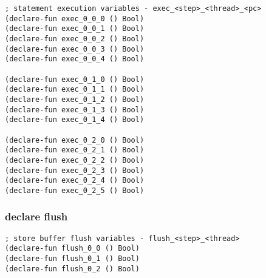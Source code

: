 \begin{algorithm}[H]
\end{algorithm}

\begin{algorithm}[H]
\end{algorithm}

\begin{lstlisting}[language=SMTLib]
; statement execution variables - exec_<step>_<thread>_<pc>
(declare-fun exec_0_0_0 () Bool)
(declare-fun exec_0_0_1 () Bool)
(declare-fun exec_0_0_2 () Bool)
(declare-fun exec_0_0_3 () Bool)
(declare-fun exec_0_0_4 () Bool)

(declare-fun exec_0_1_0 () Bool)
(declare-fun exec_0_1_1 () Bool)
(declare-fun exec_0_1_2 () Bool)
(declare-fun exec_0_1_3 () Bool)
(declare-fun exec_0_1_4 () Bool)

(declare-fun exec_0_2_0 () Bool)
(declare-fun exec_0_2_1 () Bool)
(declare-fun exec_0_2_2 () Bool)
(declare-fun exec_0_2_3 () Bool)
(declare-fun exec_0_2_4 () Bool)
(declare-fun exec_0_2_5 () Bool)
\end{lstlisting}

\subsubsection{declare flush}

\begin{algorithm}[H]
\end{algorithm}

\begin{algorithm}[H]
\end{algorithm}

\begin{lstlisting}[language=SMTLib]
; store buffer flush variables - flush_<step>_<thread>
(declare-fun flush_0_0 () Bool)
(declare-fun flush_0_1 () Bool)
(declare-fun flush_0_2 () Bool)
\end{lstlisting}

